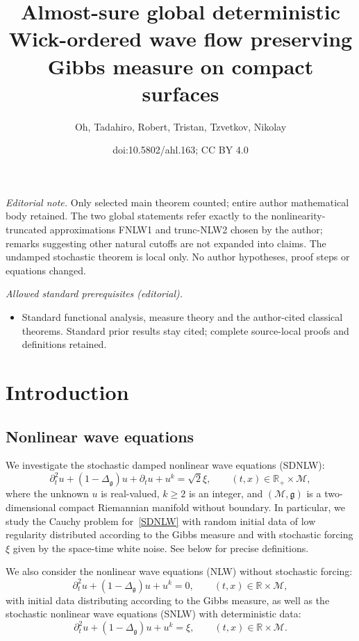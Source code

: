 \documentclass[10pt]{amsart}
\title{Almost-sure global deterministic Wick-ordered wave flow preserving Gibbs measure on compact surfaces}
\author{Oh, Tadahiro, Robert, Tristan, Tzvetkov, Nikolay}
\date{doi:10.5802/ahl.163; CC BY 4.0}
\theoremstyle{definition}\newtheorem{defi}[theo]{Definition}\newtheorem{rema}[theo]{Remark}\newtheorem{exam}[theo]{Example}\newtheorem{exem}[theo]{Example}\newtheorem{nota}[theo]{Notation}
\newcommand{\R}{\mathbb{R}}
\newcommand{\M}{\mathcal{M}}
\newcommand{\g}{\mathfrak{g}}
\newcommand{\Dlg}{\Delta_{\g}}
\newcommand{\dt}{\partial_t}
\begin{document}
\maketitle
\noindent\textit{Editorial note.} Only selected main theorem counted; entire author mathematical body retained. The two global statements refer exactly to the nonlinearity-truncated approximations FNLW1 and trunc-NLW2 chosen by the author; remarks suggesting other natural cutoffs are not expanded into claims. The undamped stochastic theorem is local only. No author hypotheses, proof steps or equations changed.\par\medskip
\noindent\textit{Allowed standard prerequisites (editorial).}\begin{itemize}
\item Standard functional analysis, measure theory and the author-cited classical theorems. Standard prior results stay cited; complete source-local proofs and definitions retained.
\end{itemize}\medskip

\section{Introduction}

\subsection{Nonlinear wave equations}
We investigate the stochastic damped nonlinear wave equations (SDNLW):
\begin{equation}\label{SDNLW}
\dt^2 u + (1 - \Dlg) u + \dt u + u^k = \sqrt{2}\xi,
\qquad (t,x) \in \R_+ \times \M,
\end{equation}
where the unknown $u$ is real-valued, $k \geq 2$ is an integer, and $(\M,\g)$ is a two-dimensional compact Riemannian manifold without boundary. In particular, we study the Cauchy problem for~\eqref{SDNLW} with random initial data of low regularity distributed according to the Gibbs measure and with stochastic forcing $\xi$ given by the space-time white noise. See below for precise definitions.

We also consider the nonlinear wave equations (NLW) without stochastic forcing:
\begin{equation}\label{NLW}
\dt^2 u + (1 - \Dlg) u + u^k = 0,
\qquad (t,x) \in \R \times \M,
\end{equation}
with initial data distributing according to the Gibbs measure, as well as the stochastic nonlinear wave equations (SNLW) with deterministic data:
\begin{equation}\label{SNLW}
\dt^2 u + (1 - \Dlg) u + u^k = \xi,
\qquad (t,x) \in \R \times \M.
\end{equation}
\end{document}
